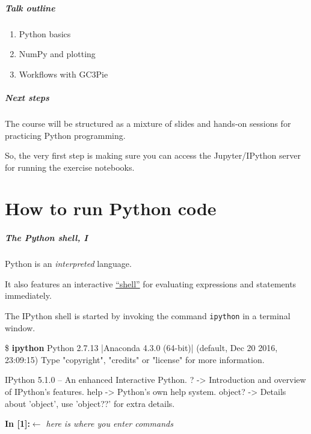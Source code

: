 \documentclass[english,serif,mathserif,xcolor=pdftex,dvipsnames,table]{beamer}
\begin{document}
\begin{frame}
  \frametitle{Talk outline}
  \begin{enumerate}
  \item Python basics
  \item NumPy and plotting
  \item Workflows with GC3Pie
  \end{enumerate}
\end{frame}


\begin{frame}
  \frametitle{Next steps}

  The course will be structured as a mixture of slides and hands-on
  sessions for practicing Python programming.

  \+
  So, the very first step is making sure you can access the Jupyter/IPython
  server for running the exercise notebooks.
\end{frame}


\part{How to run Python code}

\begin{frame}[fragile]
  \frametitle{The Python shell, I}
  Python is an \emph{interpreted} language.

  \+
  It also features an interactive
  \href{http://en.wikipedia.org/wiki/REPL}{``shell''} for evaluating
  expressions and statements immediately.

  \+
  The IPython shell is started by invoking the command
  \texttt{ipython} in a terminal window.
\begin{semiverbatim}\tiny
\$ \textbf{ipython}
Python 2.7.13 |Anaconda 4.3.0 (64-bit)| (default, Dec 20 2016, 23:09:15)
Type "copyright", "credits" or "license" for more information.

IPython 5.1.0 -- An enhanced Interactive Python.
?         -> Introduction and overview of IPython's features.
help      -> Python's own help system.
object?   -> Details about 'object', use 'object??' for extra details.

\textbf{In [1]:}{\color{blue}\normalfont\em \(\leftarrow\) here is where you enter commands}
\end{semiverbatim}
\end{frame}
\end{document}
